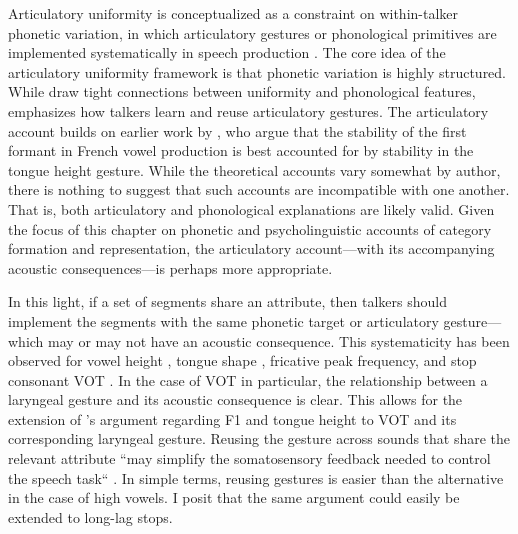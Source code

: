 Articulatory uniformity is conceptualized as a constraint on within-talker phonetic variation, in which articulatory gestures or phonological primitives are implemented systematically in speech production \citep{chodroff_2017_structure, faytak_2018_uniformity, menard_2008_invariance}. The core idea of the articulatory uniformity framework is that phonetic variation is highly structured. While \citet{chodroff_2017_structure} draw tight connections between uniformity and phonological features, \citet{faytak_2018_uniformity} emphasizes how talkers learn and reuse articulatory gestures. The articulatory account builds on earlier work by \citet{menard_2008_invariance}, who argue that the stability of the first formant in French vowel production is best accounted for by stability in the tongue height gesture. While the theoretical accounts vary somewhat by author, there is nothing to suggest that such accounts are incompatible with one another. That is, both articulatory and phonological explanations are likely valid. Given the focus of this chapter on phonetic and psycholinguistic accounts of category formation and representation, the articulatory account---with its accompanying acoustic consequences---is perhaps more appropriate. 

In this light, if a set of segments share an attribute, then talkers should implement the segments with the same phonetic target or articulatory gesture---which may or may not have an acoustic consequence. This systematicity has been observed for vowel height \citep{menard_2008_invariance}, tongue shape \citep{faytak_2018_uniformity}, fricative peak frequency, and stop consonant VOT \citep{chodroff_2017_structure}. In the case of VOT in particular, the relationship between a laryngeal gesture and its acoustic consequence is clear. This allows for the extension of \citeauthor{menard_2008_invariance}'s \citeyearpar{menard_2008_invariance} argument regarding F1 and tongue height to VOT and its corresponding laryngeal gesture. Reusing the gesture across sounds that share the relevant attribute ``may simplify the somatosensory feedback needed to control the speech task`` \citep[][p. 26]{menard_2008_invariance}. In simple terms, reusing gestures is easier than the alternative in the case of high vowels. I posit that the same argument could easily be extended to long-lag stops. 

